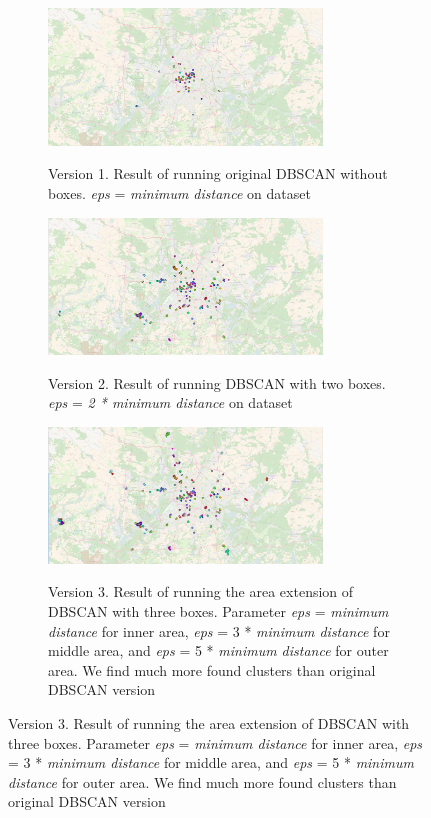 \begin{figure}
	\centering
	\begin{subfigure}
		\centering
		\includegraphics[width=0.8\textwidth]{images/1_v.PNG}\\
        \caption{ Version 1. Result of running original DBSCAN without boxes. \textit{eps} = \textit{minimum distance}  on dataset}
        \label{fig:1_v}
	\end{subfigure}%
	\begin{subfigure}
    \centering
        \includegraphics[width=0.8\textwidth]{images/2_v.PNG}\\
        \caption{ Version 2. Result of running DBSCAN with two boxes.        \textit{eps} = \textit{2 * minimum distance}  on dataset}
        \label{fig:2_v}
    \end{subfigure}%
	\begin{subfigure}
		\centering
	\includegraphics[width=0.8\textwidth]{images/3_v.PNG}\\
        	\caption{ Version 3. Result of running the area extension of DBSCAN with three boxes. Parameter \textit{eps} = \textit{minimum distance}  for inner area, \textit{eps} = 3 * \textit{minimum distance}  for middle area, and  \textit{eps} = 5 * \textit{minimum distance} for outer area. We find much more found clusters than original DBSCAN version}
        	\label{fig:3_v}
	\end{subfigure}
\end{figure}
\FloatBarrier

